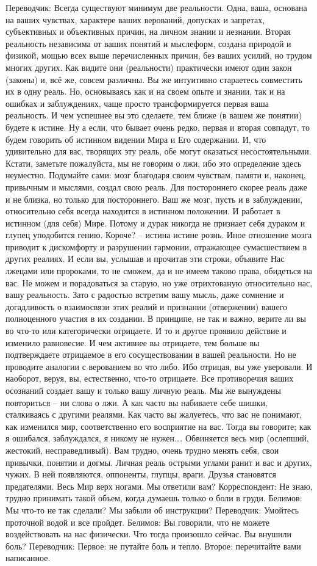 Переводчик: Всегда существуют минимум две реальности. Одна, ваша, основана на ваших чувствах, характере ваших верований, допусках и запретах, субъективных и объективных причин, на личном знании и незнании. Вторая реальность независима от ваших понятий и мыслеформ, создана природой и физикой, мощью всех выше перечисленных причин, без ваших усилий, но трудом многих других. Как видите они (реальности) практически имеют один закон (законы) и, всё же, совсем различны. Вы же интуитивно стараетесь совместить их в одну реаль. Но, основываясь как и на своем опыте и знании, так и на ошибках и заблуждениях, чаще просто трансформируется первая ваша реальность. И чем успешнее вы это сделаете, тем ближе (в вашем же понятии) будете к истине. Ну а если, что бывает очень редко, первая и вторая совпадут, то будем говорить об истинном видении Мира и Его содержании. И, что удивительно для вас, творящих эту реаль, обе могут оказаться несостоятельными. Кстати, заметьте пожалуйста, мы не говорим о лжи, ибо это определение здесь неуместно. Подумайте сами: мозг благодаря своим чувствам, памяти и, наконец, привычным и мыслями, создал свою реаль. Для постороннего скорее реаль даже и не близка, но только для постороннего. Ваш же мозг, пусть и в заблуждении, относительно себя всегда находится в истинном положении. И работает в истинном (для себя) Мире. Потому и дурак никогда не признает себя дураком и глупец уподобится гению. Короче? – истина истине рознь. Иное отношение мозга приводит к дискомфорту и разрушении гармонии, отражающее сумасшествием в других реалиях. И если вы, услышав и прочитав эти строки, объявите Нас лжецами или пророками, то не сможем, да и не имеем таково права, обидеться на вас. Не можем и порадоваться за старую, но уже отрихтованую относительно нас, вашу реальность. Зато с радостью встретим вашу мысль, даже сомнение и догадливость о взаимосвязи этих реалий и признании (отвержении) вашего полноценного участия в их создании. В принципе, не так и важно, верите ли вы во что-то или категорически отрицаете. И то и другое проявило действие и изменило равновесие. И чем активнее вы отрицаете, тем больше вы подтверждаете отрицаемое в его сосуществовании в вашей реальности. Но не проводите аналогии с верованием во что либо. Ибо отрицая, вы уже уверовали. И наоборот, веруя, вы, естественно, что-то отрицаете. Все противоречия ваших осознаний создает вашу и только вашу личную реаль. Мы же вынуждены повториться – ни слова о лжи. А как часто вы набиваете себе шишки, сталкиваясь с другими реалями. Как часто вы жалуетесь, что вас не понимают, как изменился мир, соответственно его восприятие на вас. Тогда вы говорите; как я ошибался, заблуждался, я никому не нужен…. Обвиняется весь мир (ослепший, жестокий, несправедливый). Вам трудно, очень трудно менять себя, свои привычки, понятии и догмы. Личная реаль острыми углами ранит и вас и других, чужих. В ней появляются, оппоненты, глупцы, враги. Друзья становятся предателями. Весь Мир верх ногами. Мы ответили вам?
Корреспондент: Не знаю, трудно принимать такой объем, когда думаешь только о боли в груди.
Белимов: Мы что-то не так сделали? Мы забыли об инструкции?
Переводчик: Умойтесь проточной водой и все пройдет.
Белимов: Вы говорили, что не можете воздействовать на нас физически. Что тогда произошло сейчас. Вы внушили боль?
Переводчик: Первое: не путайте боль и тепло. Второе: перечитайте вами написанное.
